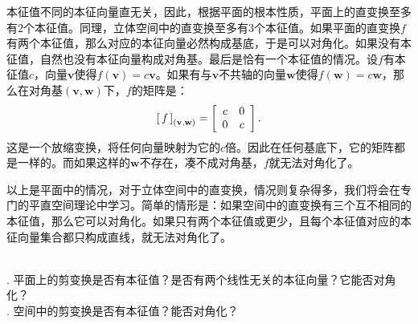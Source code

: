 \documentclass[12pt,UTF8]{ctexbook}
\begin{document}
本征值不同的本征向量直无关，因此，根据平面的根本性质，平面上的直变换至多有$2$个本征值。同理，立体空间中的直变换至多有$3$个本征值。如果平面的直变换$f$有两个本征值，那么对应的本征向量必然构成基底，于是可以对角化。如果没有本征值，自然也没有本征向量构成对角基。最后是恰有一个本征值的情况。设$f$有本征值$c$，向量$\mathbf{v}$使得$f(\mathbf{v}) = c\mathbf{v}$。如果有与$\mathbf{v}$不共轴的向量$\mathbf{w}$使得$f(\mathbf{w}) = c\mathbf{w}$，那么在对角基$(\mathbf{v},\mathbf{w})$下，$f$的矩阵是：
$$
\bmat{f}[(\mathbf{v},\mathbf{w})] = \begin{bmatrix}
    \phantom{0}c&0\phantom{0}\\\phantom{0}0&c\phantom{0}
\end{bmatrix}.
$$
这是一个放缩变换，将任何向量映射为它的$c$倍。因此在任何基底下，它的矩阵都是一样的。而如果这样的$\mathbf{w}$不存在，凑不成对角基，$f$就无法对角化了。

以上是平面中的情况，对于立体空间中的直变换，情况则复杂得多，我们将会在专门的平直空间理论中学习。简单的情形是：如果空间中的直变换有三个互不相同的本征值，那么它可以对角化。如果只有两个本征值或更少，且每个本征值对应的本征向量集合都只构成直线，就无法对角化了。

\begin{sk}
    \mbox{} \\
    . 平面上的剪变换是否有本征值？是否有两个线性无关的本征向量？它能否对角化？\\
    . 空间中的剪变换是否有本征值？能否对角化？
\end{sk}
\end{document}
